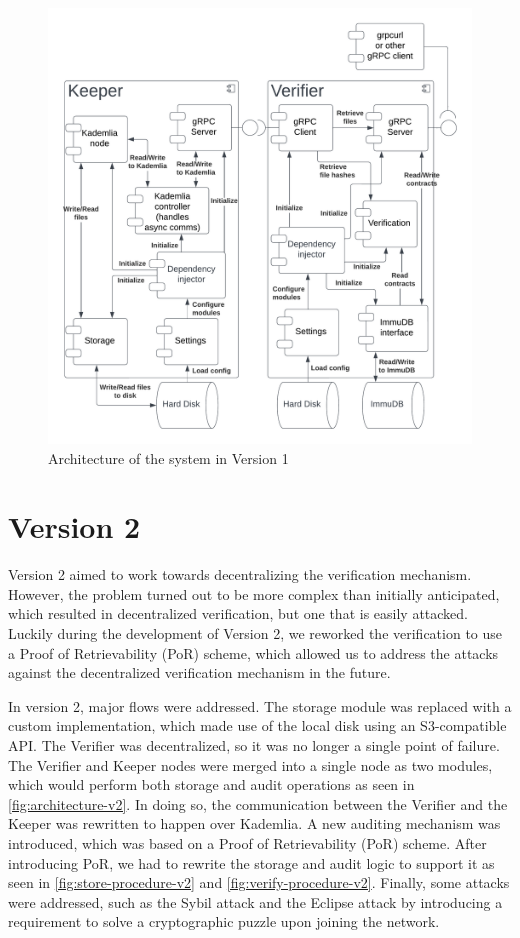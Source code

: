 \begin{figure}
    \centering
    \includegraphics[width=1\textwidth]{gfx/arch-v1.png}
    \caption{Architecture of the system in Version 1}
    \label{fig:architecture-v1}
\end{figure}

\section{Version 2}

Version 2 aimed to work towards decentralizing the verification mechanism.
However, the problem turned out to be more complex than initially anticipated,
which resulted in decentralized verification, but one that is easily attacked.
Luckily during the development of Version 2, we reworked the verification to use a Proof of Retrievability (PoR) scheme,
which allowed us to address the attacks against the decentralized verification mechanism in the future.

In version 2, major flows were addressed.
The storage module was replaced with a custom implementation, which made use of the local disk
using an S3-compatible API.
The Verifier was decentralized, so it was no longer a single point of failure.
The Verifier and Keeper nodes were merged into a single node as two modules,
which would perform both storage and audit operations as seen in \autoref{fig:architecture-v2}.
In doing so, the communication between the Verifier and the Keeper was rewritten to happen over Kademlia.
A new auditing mechanism was introduced, which was based on a Proof of Retrievability (PoR) scheme.
After introducing PoR, we had to rewrite the storage and audit logic to support it
as seen in \autoref{fig:store-procedure-v2} and \autoref{fig:verify-procedure-v2}.
Finally, some attacks were addressed, such as the Sybil attack and the Eclipse attack by introducing
a requirement to solve a cryptographic puzzle upon joining the network.

